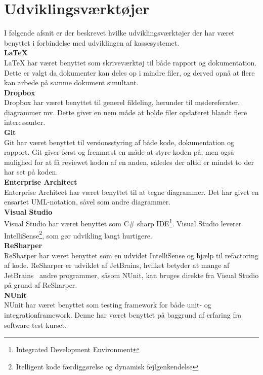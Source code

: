 \section{Udviklingsværktøjer}
I følgende afsnit er der beskrevet hvilke udviklingsværktøjer der har været benyttet i forbindelse med udviklingen af kassesystemet.\\

\textbf{LaTeX}\\
LaTeX har været benyttet som skriveværktøj til både rapport og dokumentation. Dette er valgt da dokumenter kan deles op i mindre filer, og derved opnå at flere kan arbede på samme dokument simultant. \\

\textbf{Dropbox}\\
Dropbox har været benyttet til generel fildeling, herunder til mødereferater, diagrammer mv. Dette giver en nem måde at holde filer opdateret blandt flere interessanter. \\

\textbf{Git}\\
Git har været benyttet til versionsstyring af både kode, dokumentation og rapport. Git giver først og fremmest en måde at styre koden på, men også mulighed for at få reviewet koden af en anden, således der altid er mindst to der har set på koden.\\

\textbf{Enterprise Architect}~\cite{EA}\\
Enterprise Architect har været benyttet til at tegne diagrammer. Det har givet en ensartet UML-notation, såvel som andre diagrammer.\\


\textbf{Visual Studio}\\
Visual Studio har været benyttet som C\# sharp IDE\footnote{Integrated Development Environment}. Visual Studio leverer IntelliSense\footnote{Itelligent kode færdiggørelse og dynamisk fejlgenkendelse}, som gør udvikling langt hurtigere.\\

\textbf{ReSharper}~\cite{ReSharper}\\
ReSharper har været benyttet som en udvidet IntelliSense og hjælp til refactoring af kode. ReSharper er udviklet af JetBrains, hvilket betyder at mange af JetBrains~\cite{JetBrains} andre programmer, såsom NUnit, kan bruges direkte fra Visual Studio på grund af ReSharper.\\

\textbf{NUnit}~\cite{NUnit}\\
NUnit har været benyttet som testing framework for både unit- og integrationframework. Denne har været benyttet på baggrund af erfaring fra software test kurset.\\

